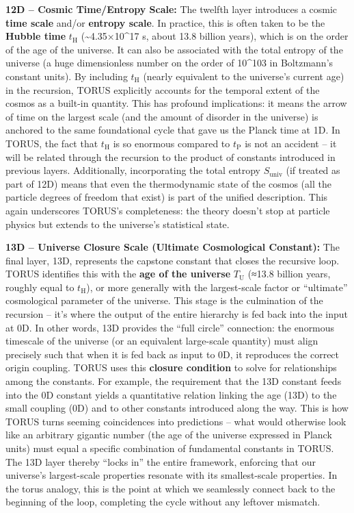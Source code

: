 \documentclass[]{article}
\newcommand{\subscript}[1]{\ensuremath{_{\mathrm{#1}}}}
\begin{document}
\textbf{12D -- Cosmic Time/Entropy Scale:} The twelfth layer introduces
a cosmic \textbf{time scale} and/or \textbf{entropy scale}. In practice,
this is often taken to be the \textbf{Hubble time}
$t\subscript{H}$ (\textasciitilde{}4.35×10\^{}17 s, about 13.8 billion years), which is
on the order of the age of the universe. It can also be associated with
the total entropy of the universe (a huge dimensionless number on the
order of 10\^{}103 in Boltzmann's constant units). By including
$t\subscript{H}$
(nearly equivalent to the universe's current age) in the recursion,
TORUS explicitly accounts for the temporal extent of the cosmos as a
built-in quantity. This has profound implications: it means the arrow of
time on the largest scale (and the amount of disorder in the universe)
is anchored to the same foundational cycle that gave us the Planck time
at 1D. In TORUS, the fact that
$t\subscript{H}$ is so
enormous compared to
$t\subscript{P}$ is
not an accident -- it will be related through the recursion to the
product of constants introduced in previous layers. Additionally,
incorporating the total entropy
$S\subscript{univ}$
(if treated as part of 12D) means that even the thermodynamic state of
the cosmos (all the particle degrees of freedom that exist) is part of
the unified description. This again underscores TORUS's completeness:
the theory doesn't stop at particle physics but extends to the
universe's statistical state.

\textbf{13D -- Universe Closure Scale (Ultimate Cosmological Constant):}
The final layer, 13D, represents the capstone constant that closes the
recursive loop. TORUS identifies this with the \textbf{age of the
universe}
$T\subscript{U}$ (≈13.8 billion years, roughly equal to
$t\subscript{H}$), or
more generally with the largest-scale factor or ``ultimate''
cosmological parameter of the universe. This stage is the culmination of
the recursion -- it's where the output of the entire hierarchy is fed
back into the input at 0D. In other words, 13D provides the ``full
circle'' connection: the enormous timescale of the universe (or an
equivalent large-scale quantity) must align precisely such that when it
is fed back as input to 0D, it reproduces the correct origin coupling.
TORUS uses this \textbf{closure condition} to solve for relationships
among the constants. For example, the requirement that the 13D constant
feeds into the 0D constant yields a quantitative relation linking the
age (13D) to the small coupling (0D) and to other constants introduced
along the way. This is how TORUS turns seeming coincidences into
predictions -- what would otherwise look like an arbitrary gigantic
number (the age of the universe expressed in Planck units) must equal a
specific combination of fundamental constants in TORUS. The 13D layer
thereby ``locks in'' the entire framework, enforcing that our universe's
largest-scale properties resonate with its smallest-scale properties. In
the torus analogy, this is the point at which we seamlessly connect back
to the beginning of the loop, completing the cycle without any leftover
mismatch.
\end{document}
